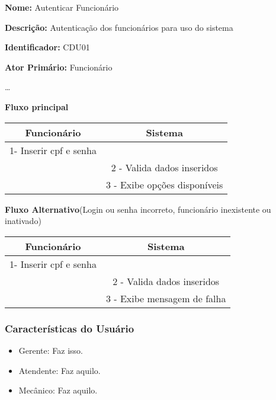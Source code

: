 	\par
	\textbf{Nome:} Autenticar Funcionário 
	\par
	\textbf{Descrição:} Autenticação dos funcionários para uso do sistema
	\par 
	\textbf{Identificador:} CDU01
	\par
	\textbf{Ator Primário:} Funcionário	
	\par
	\ldots
	\par
	\textbf{Fluxo principal}\par
	\begin{tabular}{|c|c|}
		\hline 
		Funcionário & Sistema \\ 
		\hline 
		1- Inserir cpf e senha  &  \\ 
		\hline 
		& 
		
		2 - Valida dados inseridos 
		\\ 
		\hline 
		& 
		
		3 - Exibe opções disponíveis
		\\ 
		\hline 
	\end{tabular} 
	\vspace{12px}
	\par
	\textbf{Fluxo Alternativo}(Login ou senha incorreto, funcionário inexistente ou inativado)\par
	\begin{tabular}{|c|c|}
		\hline 
		Funcionário & Sistema \\ 
		\hline 
		1- Inserir cpf e senha  &  \\ 
		\hline 
		& 
		
		2 - Valida dados inseridos 
		\\ 
		\hline 
		& 
		
		3 - Exibe mensagem de falha		
		\\ 
		\hline 
	\end{tabular} 
	\vspace{12px}
	
	\subsubsection{Características do Usuário}
	
	\begin{itemize}
	\item[] Gerente: Faz isso.
	\item[] Atendente: Faz aquilo.
	\item[] Mecânico: Faz aquilo.
	\end{itemize}

